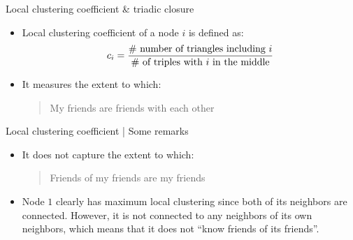 \documentclass[
    hyperref={colorlinks,linkcolor=blue,urlcolor=blue,citecolor=blue}
]{beamer}
\begin{document}
\begin{frame}{Local clustering coefficient \& triadic closure}
\begin{center}
\end{center}
\pause
\begin{itemize}
    \item<4-> Local clustering coefficient of a node $i$ is defined as:
    \[
        c_i =
        \frac{\text{\# number of triangles including \ensuremath{i}}}{%
        \text{\# of triples with \ensuremath{i} in the middle}%
    }
    \]
    \item<5-> It measures the extent to which:
    \begin{quote}
        My friends are friends with each other
    \end{quote}
\end{itemize}
\end{frame}

\begin{frame}{Local clustering coefficient | Some remarks}
\begin{itemize}
    \item<2-> It does not capture the extent to which:
    \begin{quote}
        Friends of my friends are my friends
    \end{quote}
\end{itemize}
\pause
\pause
\begin{center}
\end{center}
\pause
\begin{itemize}
    \item Node $1$ clearly has maximum local clustering since both of its
    neighbors are connected. However, it is not connected
    to any neighbors of its own neighbors, which means that it does
    not \enquote{know friends of its friends}.
\end{itemize}
\end{frame}
\end{document}
